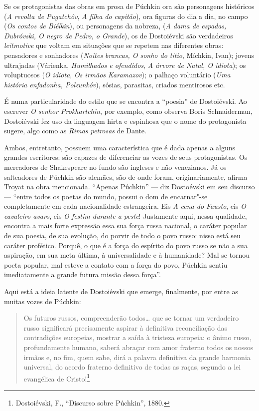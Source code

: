 Se os protagonistas das obras em prosa de Púchkin ora são personagens
históricos (\emph{A revolta de Pugatchôv}, \emph{A filha do capitão}),
ora figuras do dia a dia, no campo (\emph{Os contos de
Biélkin}), ou personagens da nobreza, (\emph{A dama de espadas,
Dubróvski, O negro de Pedro, o Grande}), os de Dostoiévski são
verdadeiros \emph{leitmotive} que voltam em situações que se repetem nas
diferentes obras: pensadores e sonhadores (\emph{Noites brancas, O
sonho do titio}, Míchkin, Ivan); jovens ultrajadas (Várienka,
\emph{Humilhados e ofendidos}, \emph{A árvore de Natal, O idiota}); os
voluptuosos (\emph{O idiota}, \emph{Os irmãos Karamazov}); o palhaço
voluntário (\emph{Uma história enfadonha, Polzunkóv}), sósias,
parasitas, criados mentirosos etc.

É numa particularidade do estilo que se encontra a ``poesia'' de
Dostoiévski. Ao escrever \emph{O senhor Prokhartchin}, por exemplo, como
observa Boris Schnaiderman, Dostoiévski fez uso da linguagem hirta e
espinhosa que o nome do protagonista sugere, algo como as \emph{Rimas
petrosas} de Dante.

Ambos, entretanto, possuem uma característica que é dada apenas a alguns
grandes escritores: são capazes de diferenciar as vozes de seus
protagonistas. Os mercadores de Shakespeare no fundo são ingleses e não
venezianos. Já os salteadores de Púchkin são alemães, são de onde foram,
originariamente, afirma Troyat na obra mencionada. ``Apenas
Púchkin'' --- diz Dostoévski em seu discurso --- ``entre todos os poetas
do mundo, possui o dom de encarnar"-se completamente em cada
nacionalidade estrangeira. Eis \emph{A cena do Fausto}, eis \emph{O cavaleiro avaro},
eis \emph{O festim durante a peste}! Justamente aqui, nessa qualidade, encontra a mais forte expressão essa
sua força russa nacional, o caráter popular de sua poesia, de sua
evolução, do porvir de todo o povo russo: nisso está seu caráter
profético. Porquê, o que é a força do espírito do povo russo se não a
sua aspiração, em sua meta última, à universalidade e à humanidade? Mal
se tornou poeta popular, mal esteve a contato com a força do povo,
Púchkin sentiu imediatamente a grande futura missão dessa força''.

Aqui está a ideia latente de Dostoiévski que emerge, finalmente, por
entre as muitas vozes de Púchkin:

\begin{quote}
Os futuros russos, compreenderão todos\ldots{} que se tornar um verdadeiro
russo significará precisamente aspirar à definitiva reconciliação das
contradições europeias, mostrar a saída à tristeza europeia: o ânimo
russo, profundamente humano, saberá abraçar com amor fraterno todos os
nossos irmãos e, no fim, quem sabe, dirá a palavra definitiva da grande
harmonia universal, do acordo fraterno definitivo de todas as raças,
segundo a lei evangélica de Cristo!\footnote{Dostoiévski, F., ``Discurso sobre Púchkin'', 1880.}
\end{quote}


